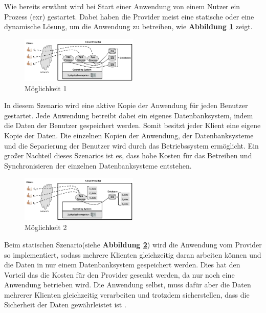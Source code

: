 Wie bereits erwähnt wird bei Start einer Anwendung von einem Nutzer ein Prozess (exr) gestartet. Dabei haben die Provider meist eine statische oder eine dynamische
Lösung, um die Anwendung zu betreiben, wie \textbf{Abbildung \ref{SaaSM1}} zeigt.
\begin{figure}[h]
    \centering
	\includegraphics[width=0.5\textwidth]{Images/SaaSM1}
	\caption{Möglichkeit 1 \cite{Badger}}
	\label{SaaSM1}
\end{figure}
In diesem Szenario wird eine aktive Kopie der Anwendung für jeden Benutzer gestartet. Jede Anwendung betreibt dabei ein eigenes Datenbanksystem, indem die Daten der Benutzer gespeichert werden.
Somit besitzt jeder Klient eine eigene Kopie der Daten. Die einzelnen Kopien der Anwendung, der Datenbanksysteme und die Separierung der Benutzer wird durch das Betriebssystem ermöglicht.
Ein großer Nachteil dieses Szenarios ist es, dass hohe Kosten für das Betreiben und Synchronisieren der einzelnen Datenbanksysteme entstehen.
\begin{figure}[h]
    \centering
	\includegraphics[width=0.5\textwidth]{Images/SaaSM2}
	\caption{Möglichkeit 2 \cite{Badger}}
	\label{SaaSM2}
\end{figure}
Beim statischen Szenario(siehe \textbf{Abbildung \ref{SaaSM2}}) wird die Anwendung vom Provider so implementiert, sodass mehrere Klienten gleichzeitig daran arbeiten können und die Daten in nur einem Datenbanksystem gespeichert werden. 
Dies hat den Vorteil das die Kosten für den Provider gesenkt werden, da nur noch eine Anwendung betrieben wird.
Die Anwendung selbst, muss dafür aber die Daten mehrerer Klienten gleichzeitig verarbeiten und trotzdem sicherstellen, dass die Sicherheit der Daten gewährleistet ist \cite{Badger}.

